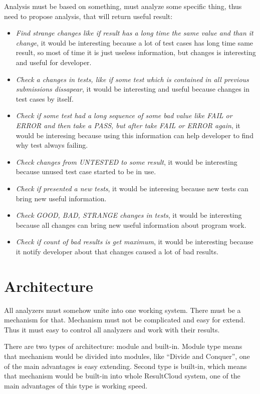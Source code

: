 Analysis must be based on something, must analyze some specific thing, thus need to propose analysis, that will return useful result:
\begin{itemize} 
\item \emph{Find strange changes like if result has a long time the same value and than it change}, it would be interesting because a lot of test cases has long time same result, so most of time it is just useless information, but changes is interesting and useful for developer.
\item \emph{Check a changes in tests, like if some test which is contained in all previous submissions dissapear}, it would be interesting and useful because changes in test cases by itself.
\item \emph{Check if some test had a long sequence of some bad value like FAIL or ERROR and then take a PASS, but after take FAIL or ERROR again}, it would be interesing because using this information can help developer to find why test always failing.
\item \emph{Check changes from UNTESTED to some result}, it would be interesting because unused test case started to be in use.
\item \emph{Check if presented a new tests}, it would be interesing because new tests can bring new useful information.
\item \emph{Check GOOD, BAD, STRANGE changes in tests}, it would be interesting because all changes can bring new useful information about program work. 
\item \emph{Check if count of bad results is get maximum}, it would be interesting because it notify developer about that changes caused a lot of bad results.
\end{itemize}


\section{Architecture} 

All analyzers must somehow unite into one working system. There must be a mechanism for that. Mechanism must not be complicated and easy for extend. Thus it must easy to control all analyzers and work with their results. 

There are two types of architecture: module and built-in. Module type means that mechanism would be divided into modules, like “Divide and Conquer”, one of the main advantages is easy extending. Second type is built-in, which means that mechanism would be built-in into whole ResultCloud system, one of the main advantages of this type is working speed.

